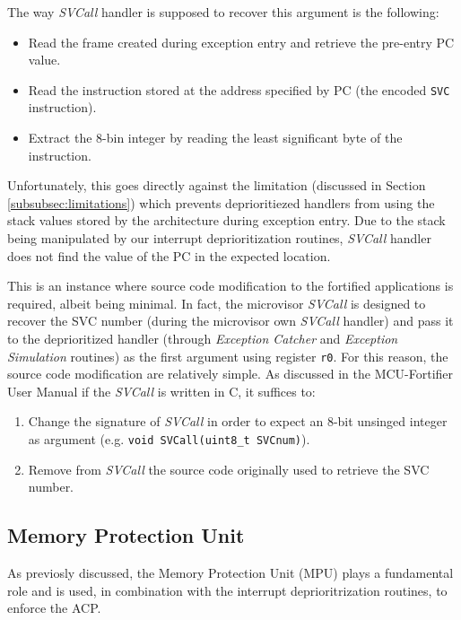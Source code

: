 \documentclass{article}
\begin{document}
The way \textit{SVCall} handler is supposed to recover this argument is the following:
\begin{itemize}
	\item Read the frame created during exception entry and retrieve the pre-entry PC value.
	\item Read the instruction stored at the address specified by PC (the encoded \verb|SVC| instruction).
	\item Extract the 8-bin integer by reading the least significant byte of the instruction.
\end{itemize}

Unfortunately, this goes directly against the limitation (discussed in Section \ref{subsubsec:limitations}) which prevents deprioritiezed handlers from using the stack values stored by the architecture during exception entry. Due to the stack being manipulated by our interrupt deprioritization routines, \textit{SVCall} handler does not find the value of the PC in the expected location.

This is an instance where source code modification to the fortified applications is required, albeit being minimal. In fact, the microvisor \textit{SVCall} is designed to recover the SVC number (during the microvisor own \textit{SVCall} handler) and pass it to the deprioritized handler (through \textit{Exception Catcher} and \textit{Exception Simulation} routines) as the first argument using register \verb|r0|.
For this reason, the source code modification are relatively simple. As discussed in the MCU-Fortifier User Manual\cite{user_manual} if the \textit{SVCall} is written in C, it suffices to:
\begin{enumerate}
	\item Change the signature of \textit{SVCall} in order to expect an 8-bit unsinged integer as argument (e.g. \verb|void SVCall(uint8_t SVCnum)|).
	\item Remove from \textit{SVCall} the source code originally used to retrieve the SVC number.
\end{enumerate}

\subsection{Memory Protection Unit}
\label{subsec:MPU}
As previosly discussed, the Memory Protection Unit (MPU) plays a fundamental role and is used, in combination with the interrupt deprioritrization routines, to enforce the ACP.
\end{document}
